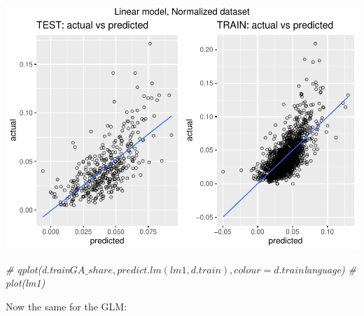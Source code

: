 \documentclass[
]{article}
\newenvironment{Shaded}{\begin{snugshade}}{\end{snugshade}}
\newcommand{\CommentTok}[1]{\textcolor[rgb]{0.56,0.35,0.01}{\textit{#1}}}
\begin{document}
\includegraphics{Lin_Mod_Clus_Analysis_files/figure-latex/unnamed-chunk-34-1.pdf}

\begin{Shaded}
\begin{Highlighting}[]
\CommentTok{\# qplot(d.train$GA\_share, predict.lm(lm1, d.train), colour = d.train$language)}
\CommentTok{\# plot(lm1)}
\end{Highlighting}
\end{Shaded}

Now the same for the GLM:
\end{document}
